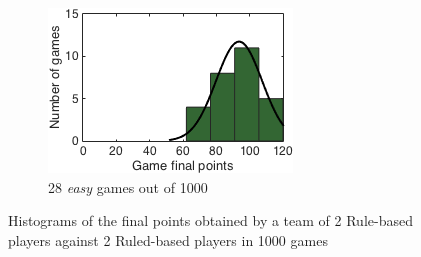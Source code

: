 \begin{figure}[h]
\begin{subfigure}[h]{0.32\textwidth}
                \includegraphics[width=\textwidth]{./img/appendix/histAeasy}
                \caption{28 \emph{easy} games out of 1000}
                \label{app:histAeasy}
        \end{subfigure}
        \caption[Histograms of the final points obtained in scenario (a) for \emph{hard}, \emph{medium} and \emph{easy} hands]{Histograms of the final points obtained by a team of 2 Rule-based players against 2 Ruled-based players in 1000 games}
        \label{app:histogramsA}
\end{figure}

